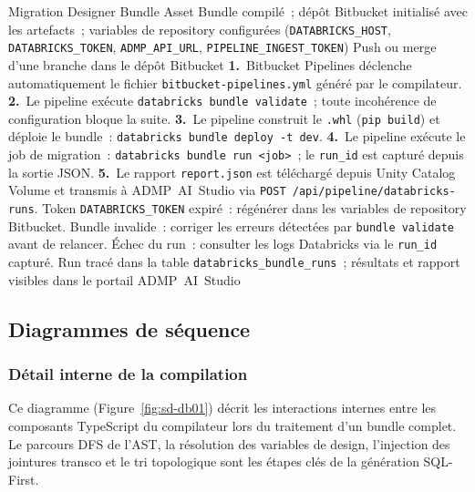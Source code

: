   {Migration Designer}
  {Bundle Asset Bundle compilé~; dépôt Bitbucket initialisé avec les artefacts~; variables de repository configurées (\texttt{DATABRICKS\_HOST}, \texttt{DATABRICKS\_TOKEN}, \texttt{ADMP\_API\_URL}, \texttt{PIPELINE\_INGEST\_TOKEN})}
  {Push ou merge d'une branche dans le dépôt Bitbucket}
  {\textbf{1.}~Bitbucket Pipelines déclenche automatiquement le fichier \texttt{bitbucket-pipelines.yml} généré par le compilateur.\newline
   \textbf{2.}~Le pipeline exécute \texttt{databricks bundle validate}~; toute incohérence de configuration bloque la suite.\newline
   \textbf{3.}~Le pipeline construit le \texttt{.whl} (\texttt{pip build}) et déploie le bundle~: \texttt{databricks bundle deploy -t dev}.\newline
   \textbf{4.}~Le pipeline exécute le job de migration~: \texttt{databricks bundle run <job>}~; le \texttt{run\_id} est capturé depuis la sortie JSON.\newline
   \textbf{5.}~Le rapport \texttt{report.json} est téléchargé depuis Unity Catalog Volume et transmis à ADMP~AI~Studio via \texttt{POST /api/pipeline/databricks-runs}.}
  {Token \texttt{DATABRICKS\_TOKEN} expiré~: régénérer dans les variables de repository Bitbucket. Bundle invalide~: corriger les erreurs détectées par \texttt{bundle validate} avant de relancer. Échec du run~: consulter les logs Databricks via le \texttt{run\_id} capturé.}
  {Run tracé dans la table \texttt{databricks\_bundle\_runs}~; résultats et rapport visibles dans le portail ADMP~AI~Studio}

\subsection*{Diagrammes de séquence}

\subsubsection*{Détail interne de la compilation}

Ce diagramme (Figure~\ref{fig:sd-db01}) décrit les interactions internes entre les composants TypeScript du compilateur lors du traitement d'un bundle complet. Le parcours DFS de l'AST, la résolution des variables de design, l'injection des jointures transco et le tri topologique sont les étapes clés de la génération SQL-First.

